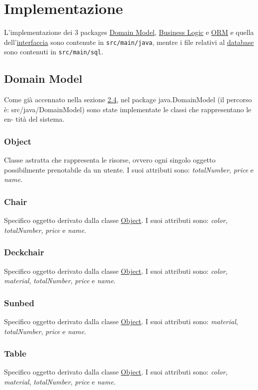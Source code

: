 \documentclass{article}
\begin{document}
\section{Implementazione}\label{sec:implementazione}
L'implementazione dei 3 packages \hyperref[subsec:domainmodel]{Domain Model}, \hyperref[subsec:BusinessLogic]{Business Logic} e
\hyperref[subsec:ORM]{ORM} e quella dell'\hyperref[subsec:interfaccia-cli]{interfaccia} sono contenute in \texttt{src/main/java},
mentre i file relativi al \hyperref[subsec:Database]{database} sono contenuti in \texttt{src/main/sql}.
\subsection{Domain Model}\label{subsec:domainmodel}
Come già accennato nella sezione \hyperref[subsec:class-diagram]{2.4}, nel package java.DomainModel (il percorso è:
src/java/DomainModel) sono state implementate le classi che rappresentano le en-
tità del sistema.
\subsubsection{Object}\label{subsubsec:object}
Classe astratta che rappresenta le risorse, ovvero ogni singolo oggetto possibilmente prenotabile da un utente. I suoi attributi sono: \textit{totalNumber}, \textit{price} e \textit{name}.
\subsubsection{Chair}\label{subsubsec:chair}
Specifico oggetto derivato dalla classe \hyperref[subsubsec:object]{Object}. I suoi attributi sono: \textit{color},  \textit{totalNumber}, \textit{price} e \textit{name}.
\subsubsection{Deckchair}\label{subsubsec:deckchair}
Specifico oggetto derivato dalla classe \hyperref[subsubsec:object]{Object}. I suoi attributi sono: \textit{color}, \textit{material},  \textit{totalNumber}, \textit{price} e \textit{name}.
\subsubsection{Sunbed}\label{subsubsec:sunbed}
Specifico oggetto derivato dalla classe \hyperref[subsubsec:object]{Object}. I suoi attributi sono: \textit{material},  \textit{totalNumber}, \textit{price} e \textit{name}.
\subsubsection{Table}\label{subsubsec:table}
Specifico oggetto derivato dalla classe \hyperref[subsubsec:object]{Object}. I suoi attributi sono: \textit{color}, \textit{material},  \textit{totalNumber}, \textit{price} e \textit{name}.
\end{document}
